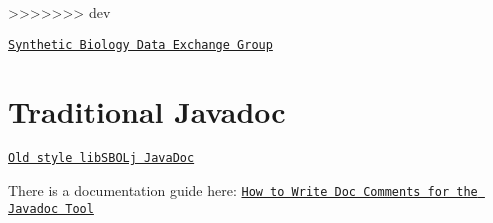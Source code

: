 \begin{DoxyItemize}
>>>>>>> dev
\item \href{http://groups.google.com/group/synbiodex/}{\tt Synthetic Biology Data Exchange Group}
\end{DoxyItemize}\hypertarget{index_javadoc_old}{}\section{Traditional Javadoc}\label{index_javadoc_old}

\begin{DoxyItemize}
\item \href{javadoc}{\tt Old style libSBOLj JavaDoc}
\item There is a documentation guide here: \href{http://www.oracle.com/technetwork/java/javase/documentation/index-137868.html}{\tt How to Write Doc Comments for the Javadoc Tool} 
\end{DoxyItemize}